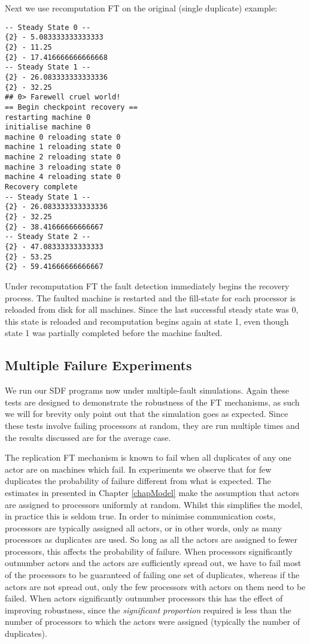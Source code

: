 Next we use recomputation FT on the original (single duplicate) example:
\begin{multicols}{2}
\begin{verbatim}-- Steady State 0 --
{2} - 5.083333333333333
{2} - 11.25
{2} - 17.416666666666668
-- Steady State 1 --
{2} - 26.083333333333336
{2} - 32.25
## 0> Farewell cruel world!
== Begin checkpoint recovery ==
restarting machine 0
initialise machine 0
machine 0 reloading state 0
machine 1 reloading state 0
machine 2 reloading state 0
machine 3 reloading state 0
machine 4 reloading state 0
Recovery complete
-- Steady State 1 --
{2} - 26.083333333333336
{2} - 32.25
{2} - 38.41666666666667
-- Steady State 2 --
{2} - 47.08333333333333
{2} - 53.25
{2} - 59.41666666666667
\end{verbatim}
\end{multicols}
\noindent Under recomputation FT the fault detection immediately begins the recovery process.
The faulted machine is restarted and the fill-state for each processor is reloaded from disk for all machines.
Since the last successful steady state was 0, this state is reloaded and recomputation begins again at state 1, even though state 1 was partially completed before the machine faulted.

\subsection{Multiple Failure Experiments}

We run our SDF programs now under multiple-fault simulations.
Again these tests are designed to demonstrate the robustness of the FT mechanisms, as such we will for brevity only point out that the simulation goes as expected.
Since these tests involve failing processors at random, they are run multiple times and the results discussed are for the average case.

The replication FT mechanism is known to fail when all duplicates of any one actor are on machines which fail.
In experiments we observe that for few duplicates the probability of failure different from what is expected.
The estimates in presented in Chapter \ref{chapModel} make the assumption that actors are assigned to processors uniformly at random.
Whilst this simplifies the model, in practice this is seldom true.
In order to minimise communication costs, processors are typically assigned all actors, or in other words, only as many processors as duplicates are used.
So long as all the actors are assigned to fewer processors, this affects the probability of failure.
When processors significantly outnumber actors and the actors are sufficiently spread out, we have to fail most of the processors to be guaranteed of failing one set of duplicates, whereas if the actors are not spread out, only the few processors with actors on them need to be failed.
When actors significantly outnumber processors this has the effect of improving robustness, since the {\em significant proportion} required is less than the number of processors to which the actors were assigned (typically the number of duplicates).

